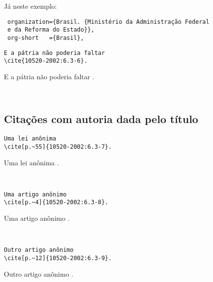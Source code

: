 \documentclass[espacosimples]{abnt}
\newcommand{\VerbL}{0.54\textwidth}
\newcommand{\LatL}{0.45\textwidth}
\begin{document}
Já neste exemplo:
\begin{verbatim}
 organization={Brasil. {Ministério da Administração Federal
 e da Reforma do Estado}},
 org-short   ={Brasil},
\end{verbatim}

\noindent\begin{minipage}[t]{\VerbL}\small\begin{verbatim}
E a pátria não poderia faltar
\cite{10520-2002:6.3-6}.
\end{verbatim}\end{minipage}\begin{minipage}[t]{\LatL}\small
E a pátria não poderia faltar
\cite{10520-2002:6.3-6}.
\end{minipage}\vspace{5mm}\\

\subsection{Citações com autoria dada pelo título}

\noindent\begin{minipage}[t]{\VerbL}\small\begin{verbatim}
Uma lei anônima
\cite[p.~55]{10520-2002:6.3-7}.
\end{verbatim}\end{minipage}\begin{minipage}[t]{\LatL}\small
Uma lei anônima
\cite[p.~55]{10520-2002:6.3-7}.
\end{minipage}\vspace{5mm}\\

\noindent\begin{minipage}[t]{\VerbL}\small\begin{verbatim}
Uma artigo anônimo
\cite[p.~4]{10520-2002:6.3-8}.
\end{verbatim}\end{minipage}\begin{minipage}[t]{\LatL}\small
Uma artigo anônimo
\cite[p.~4]{10520-2002:6.3-8}.
\end{minipage}\vspace{5mm}\\

\noindent\begin{minipage}[t]{\VerbL}\small\begin{verbatim}
Outro artigo anônimo
\cite[p.~12]{10520-2002:6.3-9}.
\end{verbatim}\end{minipage}\begin{minipage}[t]{\LatL}\small
Outro artigo anônimo
\cite[p.~12]{10520-2002:6.3-9}.
\end{minipage}\vspace{5mm}\\
\end{document}
